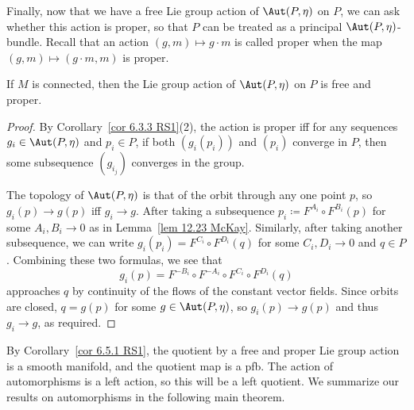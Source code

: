 Finally, now that we have a free Lie group action of $\Aut(P,\eta)$ on $P$, we can ask whether this action is proper, so that $P$ can be treated as a principal $\Aut(P,\eta)$-bundle. Recall that an action $(g,m)\mapsto g\cdot m$ is called proper when the map $(g,m)\mapsto (g\cdot m,m)$ is proper. 

\begin{cor}
    If $M$ is connected, then the Lie group action of $\Aut(P,\eta)$ on $P$ is free and proper.
\end{cor}
\begin{proof}
    By Corollary~\ref{cor 6.3.3 RS1}(2), the action is proper iff for any sequences $g_i\in \Aut(P,\eta)$ and $p_i\in P$, if both $(g_i(p_i))$ and $(p_i)$ converge in $P$, then some subsequence $(g_{i_j})$ converges in the group.

    The topology of $\Aut(P,\eta)$ is that of the orbit through any one point $p$, so $g_i(p)\to g(p)$ iff $g_i\to g$. After taking a subsequence $p_i\coloneqq F^{A_i}\circ F^{B_i}(p)$ for some $A_i,B_i\to 0$ as in Lemma~\ref{lem 12.23 McKay}. Similarly, after taking another subsequence, we can write $g_i(p_i)=F^{C_i}\circ F^{D_i}(q)$ for some $C_i,D_i\to 0$ and $q\in P$. Combining these two formulas, we see that
    \[g_i(p)=F^{-B_i}\circ F^{-A_i}\circ F^{C_i}\circ F^{D_i}(q)\]
    approaches $q$ by continuity of the flows of the constant vector fields. Since orbits are closed, $q=g(p)$ for some $g\in \Aut(P,\eta)$, so $g_i(p)\to g(p)$ and thus $g_i\to g$, as required.
\end{proof}

By Corollary~\ref{cor 6.5.1 RS1}, the quotient by a free and proper Lie group action is a smooth manifold, and the quotient map is a \gls{pfb}. The action of automorphisms is a left action, so this will be a left quotient. We summarize our results on automorphisms in the following main theorem.

